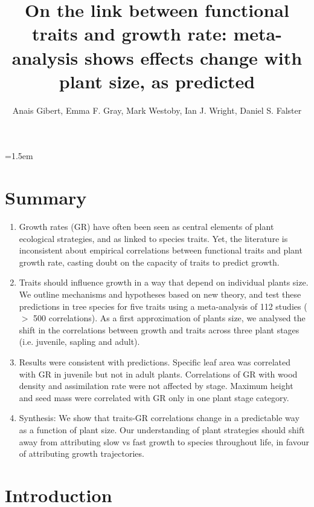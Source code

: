 \documentclass[a4paper,11pt]{article}
\title{On the link between functional traits and growth rate: meta-analysis shows effects change with plant size, as predicted}
\author{Anais Gibert\textasteriskcentered, Emma F. Gray, Mark Westoby, Ian J. Wright, Daniel S. Falster}
\affiliation{Biological Sciences, Macquarie University NSW 2109, Australia\\
\textasteriskcentered Email for correspondence: \texttt{ anais.gibert@gmail.com}\\
Word count: ~XXXX words}
\date{}
\begin{document}
\mstitlepage
\noindent
\parindent=1.5em
\addtolength{\parskip}{.3em}
\doublespacing
\linenumbers
\section{Summary}\label{abstract}
\begin{enumerate}
\def\labelenumi{\arabic{enumi}.}
\itemsep1pt\parskip0pt
\item Growth rates (GR) have often been seen as central elements of plant ecological strategies, and as linked to species traits. Yet, the literature is inconsistent about empirical correlations between functional traits and plant growth rate, casting doubt on the capacity of traits to predict growth.

\item Traits should influence growth in a way that depend on individual plants size. We outline mechanisms and hypotheses based on new theory, and test these predictions in tree species for five traits using a meta-analysis of 112 studies ($>$ 500 correlations). As a first approximation of plants size, we analysed the shift in the correlations between growth and traits across three plant stages (i.e. juvenile, sapling and adult).

\item Results were consistent with predictions. Specific leaf area was correlated with GR in juvenile but not in adult plants. Correlations of GR with wood density and assimilation rate were not affected by stage. Maximum height and seed mass were correlated with GR only in one plant stage category.

\item Synthesis: We show that traits-GR correlations change in a predictable way as a function of plant size. Our understanding of plant strategies should shift away from attributing slow vs fast growth to species throughout life, in favour of attributing growth trajectories.

\end{enumerate}

\clearpage

\section*{Introduction}\label{introduction}
\end{document}
